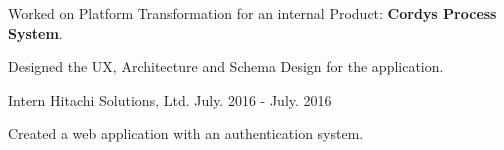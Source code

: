 \begin{cventries}
    {
      \begin{cvitems}
        \item {Worked on Platform Transformation for an internal Product: \textbf{Cordys Process System}.}
        \item {Designed the UX, Architecture and Schema Design for the application.}
      \end{cvitems} 
    }
  \cventry
    {Intern}
    {Hitachi Solutions, Ltd.}
    {}
    {July. 2016 - July. 2016}
    {
      \begin{cvitems}
        \item {Created a web application with an authentication system.}    
      \end{cvitems}
    }
\end{cventries}